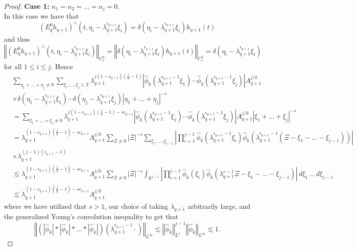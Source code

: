 \documentclass[10pt,a4paper]{amsart}
\newcommand{\R}{\mathbb R}
\newcommand{\Z}{\mathbb Z}
\newcommand{\ep}{\varepsilon}
\begin{document}
\begin{proof}
    \textbf{Case 1:} $n_1 = n_2 = \ldots =n_j = 0$.\\
    In this case we have that
    $$
    \left(E_q^0 h_{q+1}\right)^{\wedge}(t,\eta_i - \lambda_{q+1}^{\epsilon_{q+1}} \xi_i) = \delta(\eta_i - \lambda_{q+1}^{\epsilon_{q+1}} \xi_i) h_{q+1}(t)
    $$
    and thus
    $$
    \left\Vert \left(E_q^{0} h_{q+1}\right)^{\wedge}(t,\eta_i - \lambda_{q+1}^{\epsilon_{q+1}} \xi_i) \right\Vert_{C_t^0} = \left\Vert \delta(\eta_i - \lambda_{q+1}^{\epsilon_{q+1}} \xi_i) h_{q+1}(t) \right\Vert_{C_t^0} = \delta(\eta_i - \lambda_{q+1}^{\epsilon_{q+1}} \xi_i)
    $$
    for all $1 \leq i \leq j$. Hence
    \begin{equation}\label{eq:n=0_case}
        \begin{split}
            &\sum_{\eta_1 + \ldots + \eta_j \not=0} \sum_{\xi_1,\ldots,\xi_j \in \Z} \lambda_{q+1}^{j(1-\epsilon_{q+1})\left(\frac{1}{k} - 1\right)} \left|\hat{\phi}_k\left(\lambda_{q+1}^{\epsilon_{q+1}-1}\xi_1\right) \cdots \hat{\phi}_k\left(\lambda_{q+1}^{\epsilon_{q+1}-1}\xi_j\right)\right| A_{q+1}^{j/k}\\
            &\times \delta(\eta_1 - \lambda_{q+1}^{\epsilon_{q+1}} \xi_1) \cdots \delta(\eta_j - \lambda_{q+1}^{\epsilon_{q+1}} \xi_j) |\eta_1 + \ldots + \eta_j|^{-s}\\
            &= \sum_{\xi_1 + \ldots + \xi_j \not=0} \lambda_{q+1}^{j(1-\epsilon_{q+1})\left(\frac{1}{k}-1\right) - s\epsilon_{q+1}} \left| \hat{\phi}_k\left(\lambda_{q+1}^{\epsilon_{q+1}-1}\xi_1\right) \cdots \hat{\phi}_k\left(\lambda_{q+1}^{\epsilon_{q+1}-1}\xi_j\right)\right| A_{q+1}^{j/k} |\xi_1 + \ldots + \xi_j|^{-s}\\
            &= \lambda_{q+1}^{(1-\epsilon_{q+1})\left(\frac{j}{k}-1\right)-s\epsilon_{q+1}} A_{q+1}^{j/k} \sum_{\Xi \not=0} |\Xi|^{-s} \sum_{\xi_1,\ldots,\xi_{j-1}} \left|\prod_{i=1}^{j-1}\hat{\phi}_k\left(\lambda_{q+1}^{\epsilon_{q+1}-1}\xi_i\right) \hat{\phi}_k\left(\lambda_{q+1}^{\epsilon_{q+1}-1}\left(\Xi - \xi_1 - \ldots - \xi_{j-1}\right)\right)\right|\\
            &\times \lambda_{q+1}^{(j-1)(\epsilon_{q+1}-1)}\\
            &\lesssim \lambda_{q+1}^{(1-\epsilon_{q+1})\left(\frac{j}{k}-1\right)-s\epsilon_{q+1}} A_{q+1}^{j/k} \sum_{\Xi \not=0} |\Xi|^{-s} \int_{\R^{j-1}} \left| \prod_{i=1}^{j-1} \hat{\phi}_k(\xi_i) \hat{\phi}_k(\lambda_{q+1}^{\ep -1}\Xi - \xi_1 - \ldots - \xi_{j-1})\right|\, d\xi_1\, \ldots\, d\xi_{j-1}\\
            &\lesssim \lambda_{q+1}^{(1-
            \epsilon_{q+1})\left(\frac{j}{k}-1\right)-s\epsilon_{q+1}} A_{q+1}^{j/k}
        \end{split}
    \end{equation}
    where we have utilized that $s > 1$, our choice of taking $\lambda_{q+1}$ arbitrarily large, and the generalized Young's convolution inequality to get that
    $$
    \left\Vert \left(|\hat{\phi}_k| \ast |\hat{\phi}_k| \ast \ldots \ast |\hat{\phi}_k|\right)\left(\lambda_{q+1}^{\epsilon_{q+1}-1} \cdot\right)\right\Vert_{L^\infty} \lesssim \left\Vert \hat{\phi}_k\right\Vert_{L^1}^{j-1} \left\Vert \hat{\phi}_k \right\Vert_{L^\infty} \lesssim 1.
    $$


\end{proof}
\end{document}
